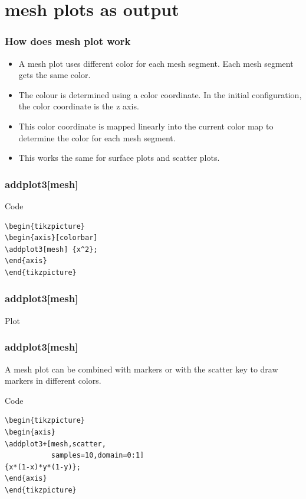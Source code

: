 \documentclass{beamer}
\begin{document}
\section{mesh plots as output}
\begin{frame}
\frametitle{How does mesh plot work}
\begin{itemize}
\item A mesh plot uses different color for each mesh segment. Each mesh segment gets the same color. 
\item The colour is determined using a color coordinate. In the initial configuration, the color coordinate is the z axis.
\item This color coordinate is mapped linearly into the current color map to determine the color for each mesh segment.
\item This works the same for surface plots and scatter plots.
\end{itemize}
\end{frame}
\begin{frame}[fragile]
\frametitle{\color{blue} addplot3[mesh]}
\begin{block}{Code}
\begin{verbatim}
\begin{tikzpicture}
\begin{axis}[colorbar]
\addplot3[mesh] {x^2};
\end{axis}
\end{tikzpicture}
\end{verbatim}
\end{block}
\end{frame}
\begin{frame}[fragile]
\frametitle{\color{blue} addplot3[mesh]}
\begin{block}{Plot}
\end{block}
\end{frame}
\begin{frame}[fragile]
\frametitle{\color{blue} addplot3[mesh]}
A mesh plot can be combined with markers or with the scatter key to draw markers in different colors.
\vspace{20pt}
\begin{block}{Code}
\begin{verbatim}
\begin{tikzpicture}
\begin{axis}
\addplot3+[mesh,scatter,
           samples=10,domain=0:1]
{x*(1-x)*y*(1-y)};
\end{axis}
\end{tikzpicture}
\end{verbatim}
\end{block}
\end{frame}
\end{document}
